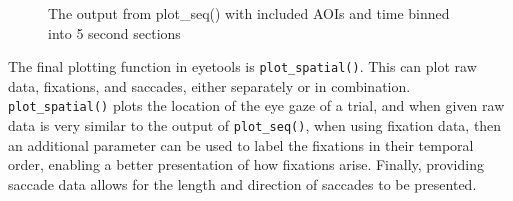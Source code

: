 \documentclass[
  man,
  floatsintext,
  longtable,
  nolmodern,
  notxfonts,
  notimes,
  colorlinks=true,linkcolor=blue,citecolor=blue,urlcolor=blue]{apa7}
\begin{document}
\begin{figure}[H]

\caption{\label{fig-seq}The output from plot\_seq() with included AOIs
and time binned into 5 second sections}


\end{figure}%

The final plotting function in eyetools is \texttt{plot\_spatial()}.
This can plot raw data, fixations, and saccades, either separately or in
combination. \texttt{plot\_spatial()} plots the location of the eye gaze
of a trial, and when given raw data is very similar to the output of
\texttt{plot\_seq()}, when using fixation data, then an additional
parameter can be used to label the fixations in their temporal order,
enabling a better presentation of how fixations arise. Finally,
providing saccade data allows for the length and direction of saccades
to be presented.
\end{document}
